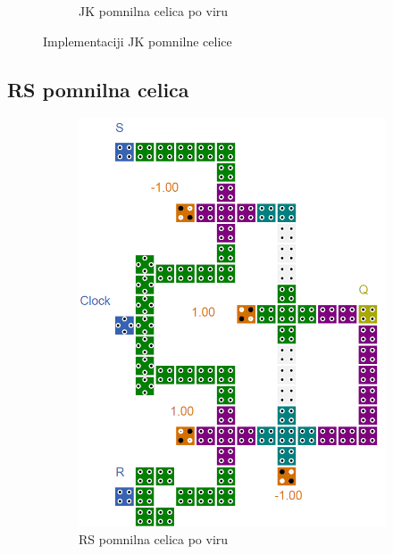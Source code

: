 \documentclass[a4paper, 11pt]{article}
\begin{document}
\begin{figure}[h!]
\begin{subfigure}[b]{0.4\textwidth}
	\caption{JK pomnilna celica po viru \cite{a_novel_approach}}
	\label{fig-jk-2}
	\end{subfigure}
	\caption{Implementaciji JK pomnilne celice}
	\label{fig-jk}
\end{figure}

\subsection{RS pomnilna celica}
\begin{figure}[h!]
	\begin{subfigure}[b]{0.4\textwidth}
	\includegraphics[width=\textwidth]{../img/vir_4/sr.png}
	\caption{RS pomnilna celica po viru \cite{quantum_dot}}
	\label{fig-rs-1}
	\end{subfigure}
	\begin{subfigure}[b]{0.4\textwidth}

\end{subfigure}
\end{figure}
\end{document}
